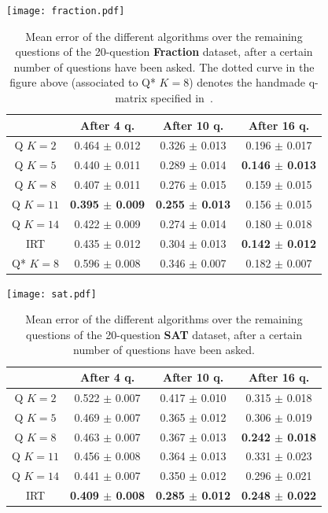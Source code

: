 \documentclass{edm_template}
\begin{document}
\begin{table}[h]
\texttt{[image: fraction.pdf]}
\small\centering\begin{tabular}{@{}c|ccc@{}}
& After 4 q. & After 10 q. & After 16 q.\\
\hline
Q $K = 2$ & 0.464 $\pm$ 0.012 & 0.326 $\pm$ 0.013 & 0.196 $\pm$ 0.017 \\
Q $K = 5$ & 0.440 $\pm$ 0.011 & 0.289 $\pm$ 0.014 & \textbf{0.146 $\pm$ 0.013} \\
Q $K = 8$ & 0.407 $\pm$ 0.011 & 0.276 $\pm$ 0.015 & 0.159 $\pm$ 0.015 \\
Q $K = 11$ & \textbf{0.395 $\pm$ 0.009} & \textbf{0.255 $\pm$ 0.013} & 0.156 $\pm$ 0.015 \\
Q $K = 14$ & 0.422 $\pm$ 0.009 & 0.274 $\pm$ 0.014 & 0.180 $\pm$ 0.018 \\
IRT & 0.435 $\pm$ 0.012 & 0.304 $\pm$ 0.013 & \textbf{0.142 $\pm$ 0.012} \\
Q* $K = 8$ & 0.596 $\pm$ 0.008 & 0.346 $\pm$ 0.007 & 0.182 $\pm$ 0.007 \\
\end{tabular}
\caption{Mean error of the different algorithms over the remaining questions of the 20-question \textbf{Fraction} dataset, after a certain number of questions have been asked. The dotted curve in the figure above (associated to Q* $K = 8$) denotes the handmade q-matrix specified in~\cite{DeLaTorreDouglas2004,DeCarlo2010}.}
\label{tab:fraction}
\end{table}

\begin{table}[h]
\texttt{[image: sat.pdf]}
\small\centering\begin{tabular}{@{}c|ccc@{}}
& After 4 q. & After 10 q. & After 16 q.\\
\hline
Q $K = 2$ & 0.522 $\pm$ 0.007 & 0.417 $\pm$ 0.010 & 0.315 $\pm$ 0.018 \\
Q $K = 5$ & 0.469 $\pm$ 0.007 & 0.365 $\pm$ 0.012 & 0.306 $\pm$ 0.019 \\
Q $K = 8$ & 0.463 $\pm$ 0.007 & 0.367 $\pm$ 0.013 & \textbf{0.242 $\pm$ 0.018} \\
Q $K = 11$ & 0.456 $\pm$ 0.008 & 0.364 $\pm$ 0.013 & 0.331 $\pm$ 0.023 \\
Q $K = 14$ & 0.441 $\pm$ 0.007 & 0.350 $\pm$ 0.012 & 0.296 $\pm$ 0.021 \\
IRT & \textbf{0.409 $\pm$ 0.008} & \textbf{0.285 $\pm$ 0.012} & \textbf{0.248 $\pm$ 0.022} \\
\end{tabular}
\caption{Mean error of the different algorithms over the remaining questions of the 20-question \textbf{SAT} dataset, after a certain number of questions have been asked.}
\label{tab:sat}
\end{table}
\end{document}

